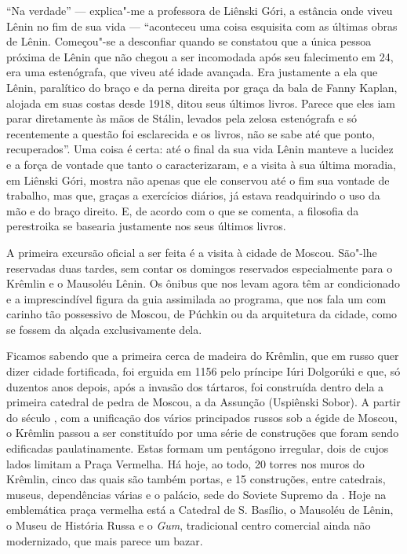 ``Na verdade'' --- explica"-me a professora de Liênski Góri, a estância
onde viveu Lênin no fim de sua vida --- ``aconteceu uma coisa esquisita
com as últimas obras de Lênin. Começou"-se a desconfiar quando se
constatou que a única pessoa próxima de Lênin que não chegou a ser
incomodada após seu falecimento em 24, era uma estenógrafa, que viveu
até idade avançada. Era justamente a ela que Lênin, paralítico do braço
e da perna direita por graça da bala de Fanny Kaplan, alojada em suas
costas desde 1918, ditou seus últimos livros. Parece que eles iam parar
diretamente às mãos de Stálin, levados pela zelosa estenógrafa e só
recentemente a questão foi esclarecida e os livros, não se sabe até que
ponto, recuperados''. Uma coisa é certa: até o final da sua vida Lênin
manteve a lucidez e a força de vontade que tanto o caracterizaram, e a
visita à sua última moradia, em Liênski Góri, mostra não apenas que ele
conservou até o fim sua vontade de trabalho, mas que, graças a
exercícios diários, já estava readquirindo o uso da mão e do braço
direito. E, de acordo com o que se comenta, a filosofia da perestroika
se basearia justamente nos seus últimos livros.

A primeira excursão oficial a ser feita é a visita à cidade de Moscou.
São"-lhe reservadas duas tardes, sem contar os domingos reservados
especialmente para o Krêmlin e o Mausoléu Lênin. Os ônibus que nos levam
agora têm ar condicionado e a imprescindível figura da guia assimilada
ao programa, que nos fala um com carinho tão possessivo de Moscou, de
Púchkin ou da arquitetura da cidade, como se fossem da alçada
exclusivamente dela.

Ficamos sabendo que a primeira cerca de madeira do Krêmlin, que em russo
quer dizer cidade fortificada, foi erguida em 1156 pelo príncipe Iúri
Dolgorúki e que, só duzentos anos depois, após a invasão dos tártaros,
foi construída dentro dela a primeira catedral de pedra de Moscou, a da
Assunção (Uspiênski Sobor). A partir do século , com a unificação dos
vários principados russos sob a égide de Moscou, o Krêmlin passou a ser
constituído por uma série de construções que foram sendo edificadas
paulatinamente. Estas formam um pentágono irregular, dois de cujos lados
limitam a Praça Vermelha. Há hoje, ao todo, 20 torres nos muros do
Krêmlin, cinco das quais são também portas, e 15 construções, entre
catedrais, museus, dependências várias e o palácio, sede do Soviete
Supremo da . Hoje na emblemática praça vermelha está a Catedral de
S. Basílio, o Mausoléu de Lênin, o Museu de História Russa e o
\emph{Gum}, tradicional centro comercial ainda não modernizado, que mais
parece um bazar.

